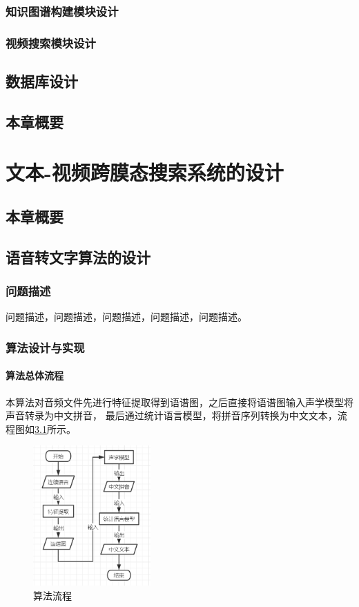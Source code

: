 \documentclass[12pt,a4paper,fancyhdr,openany,oneside]{ctexbook}
\begin{document}
\subsection{知识图谱构建模块设计}
\subsection{视频搜索模块设计}
\section{数据库设计}
\section{本章概要}







% 
\chapter{文本-视频跨膜态搜索系统的设计}
\section{本章概要}
\section{语音转文字算法的设计}
\subsection{问题描述}
问题描述，问题描述，问题描述，问题描述，问题描述。
\subsection{算法设计与实现}
\subsubsection{算法总体流程} 
本算法对音频文件先进行特征提取得到语谱图，之后直接将语谱图输入声学模型将声音转录为中文拼音，
最后通过统计语言模型，将拼音序列转换为中文文本，流程图如\ref{flowchart}所示。
\begin{figure}[htbp]
    \centering
        \includegraphics[width=0.4\textwidth]{resource/img/flowchart.png}
        \caption{算法流程}
        \label{flowchart}
\end{figure}
\end{document}
